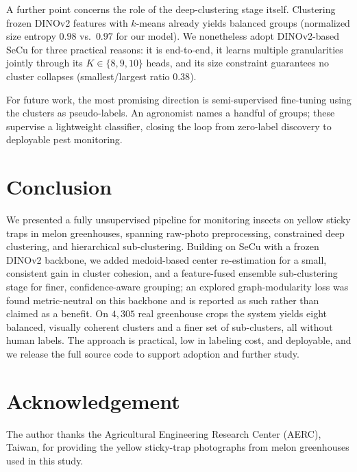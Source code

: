 \documentclass[10pt,a4paper,twocolumn]{article}
\begin{document}
A further point concerns the role of the deep-clustering stage itself. Clustering frozen DINOv2 features with $k$-means already yields balanced groups (normalized size entropy $0.98$ vs.\ $0.97$ for our model). We nonetheless adopt DINOv2-based SeCu for three practical reasons: it is end-to-end, it learns multiple granularities jointly through its $K\!\in\!\{8,9,10\}$ heads, and its size constraint guarantees no cluster collapses (smallest/largest ratio $0.38$).

For future work, the most promising direction is semi-supervised fine-tuning using the clusters as pseudo-labels. An agronomist names a handful of groups; these supervise a lightweight classifier, closing the loop from zero-label discovery to deployable pest monitoring.

\section{Conclusion}

We presented a fully unsupervised pipeline for monitoring insects on yellow sticky traps in melon greenhouses, spanning raw-photo preprocessing, constrained deep clustering, and hierarchical sub-clustering. Building on SeCu with a frozen DINOv2 backbone, we added medoid-based center re-estimation for a small, consistent gain in cluster cohesion, and a feature-fused ensemble sub-clustering stage for finer, confidence-aware grouping; an explored graph-modularity loss was found metric-neutral on this backbone and is reported as such rather than claimed as a benefit. On $4{,}305$ real greenhouse crops the system yields eight balanced, visually coherent clusters and a finer set of sub-clusters, all without human labels. The approach is practical, low in labeling cost, and deployable, and we release the full source code to support adoption and further study.

\section*{Acknowledgement}
The author thanks the Agricultural Engineering Research Center (AERC), Taiwan, for providing the yellow sticky-trap photographs from melon greenhouses used in this study.
\end{document}
